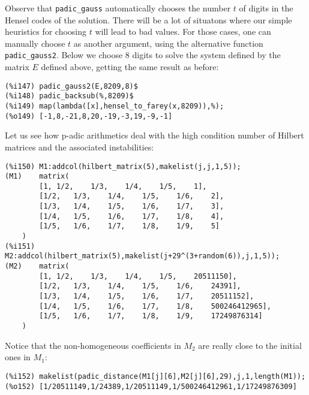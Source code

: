 \documentclass[fleqn]{cas-sc}
\begin{document}
Observe that \texttt{padic\_gauss} automatically chooses the number $t$ of
digits in the Hensel codes of the solution. There will be a lot of situatons
where our simple heuristics for choosing $t$ will lead to bad values. 
For those cases, one can manually choose $t$ as another argument,
using the alternative function \texttt{padic\_gauss2}. 
Below we choose $8$ digits to solve the system defined by the matrix $E$
defined above, getting the same result as before:

\begin{verbatim}
(%i147)	padic_gauss2(E,8209,8)$
(%i148)	padic_backsub(%,8209)$
(%i149)	map(lambda([x],hensel_to_farey(x,8209)),%);
(%o149)	[-1,8,-21,8,20,-19,-3,19,-9,-1]
\end{verbatim}

Let us see how p-adic arithmetics deal with the high condition number of
	Hilbert matrices and the associated instabilities:
\begin{verbatim}
(%i150)	M1:addcol(hilbert_matrix(5),makelist(j,j,1,5));
(M1)	matrix(
		[1,	1/2,	1/3,	1/4,	1/5,	1],
		[1/2,	1/3,	1/4,	1/5,	1/6,	2],
		[1/3,	1/4,	1/5,	1/6,	1/7,	3],
		[1/4,	1/5,	1/6,	1/7,	1/8,	4],
		[1/5,	1/6,	1/7,	1/8,	1/9,	5]
	)
(%i151)	M2:addcol(hilbert_matrix(5),makelist(j+29^(3+random(6)),j,1,5));
(M2)	matrix(
		[1,	1/2,	1/3,	1/4,	1/5,	20511150],
		[1/2,	1/3,	1/4,	1/5,	1/6,	24391],
		[1/3,	1/4,	1/5,	1/6,	1/7,	20511152],
		[1/4,	1/5,	1/6,	1/7,	1/8,	500246412965],
		[1/5,	1/6,	1/7,	1/8,	1/9,	17249876314]
	)
\end{verbatim}
Notice that the non-homogeneous coefficients in $M_2$ are really close to the initial ones in 
$M_1$:
\begin{verbatim}
(%i152)	makelist(padic_distance(M1[j][6],M2[j][6],29),j,1,length(M1));
(%o152)	[1/20511149,1/24389,1/20511149,1/500246412961,1/17249876309]
\end{verbatim}
\end{document}

